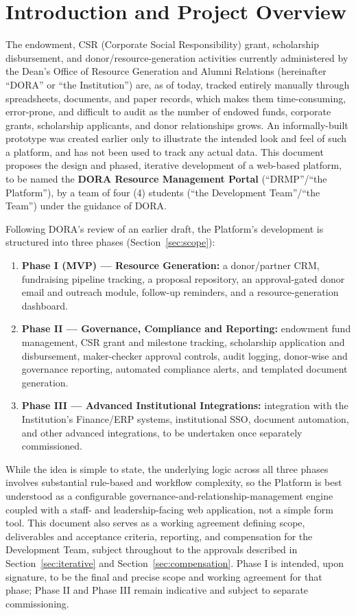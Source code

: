 \documentclass[11pt]{article}
\begin{document}
\tableofcontents
\clearpage

\section{Introduction and Project Overview}
The endowment, CSR (Corporate Social Responsibility) grant, scholarship disbursement, and donor/resource-generation activities currently administered by the Dean's Office of Resource Generation and Alumni Relations (hereinafter ``DORA'' or ``the Institution'') are, as of today, tracked entirely manually through spreadsheets, documents, and paper records, which makes them time-consuming, error-prone, and difficult to audit as the number of endowed funds, corporate grants, scholarship applicants, and donor relationships grows. An informally-built prototype was created earlier only to illustrate the intended look and feel of such a platform, and has not been used to track any actual data. This document proposes the design and phased, iterative development of a web-based platform, to be named the \textbf{DORA Resource Management Portal} (``DRMP''/``the Platform''), by a team of four (4) students (``the Development Team''/``the Team'') under the guidance of DORA.

Following DORA's review of an earlier draft, the Platform's development is structured into three phases (Section~\ref{sec:scope}):
\begin{enumerate}[leftmargin=1.6em, itemsep=3pt]
\item \textbf{Phase I (MVP) --- Resource Generation:} a donor/partner CRM, fundraising pipeline tracking, a proposal repository, an approval-gated donor email and outreach module, follow-up reminders, and a resource-generation dashboard.
\item \textbf{Phase II --- Governance, Compliance and Reporting:} endowment fund management, CSR grant and milestone tracking, scholarship application and disbursement, maker-checker approval controls, audit logging, donor-wise and governance reporting, automated compliance alerts, and templated document generation.
\item \textbf{Phase III --- Advanced Institutional Integrations:} integration with the Institution's Finance/ERP systems, institutional SSO, document automation, and other advanced integrations, to be undertaken once separately commissioned.
\end{enumerate}

While the idea is simple to state, the underlying logic across all three phases involves substantial rule-based and workflow complexity, so the Platform is best understood as a configurable governance-and-relationship-management engine coupled with a staff- and leadership-facing web application, not a simple form tool. This document also serves as a working agreement defining scope, deliverables and acceptance criteria, reporting, and compensation for the Development Team, subject throughout to the approvals described in Section~\ref{sec:iterative} and Section~\ref{sec:compensation}. Phase I is intended, upon signature, to be the final and precise scope and working agreement for that phase; Phase II and Phase III remain indicative and subject to separate commissioning.
\end{document}
